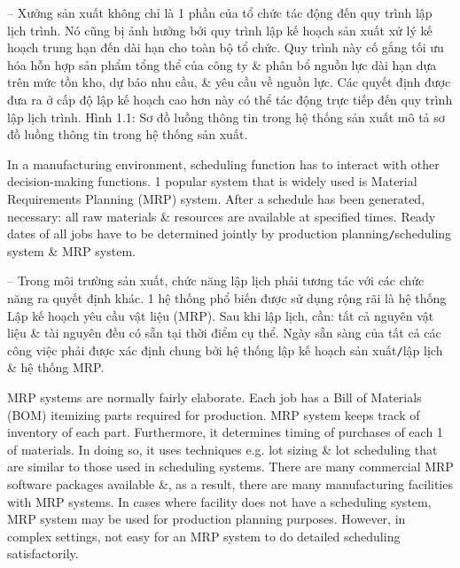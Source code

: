 \documentclass{article}
\begin{document}
\begin{itemize}
\begin{itemize}
\begin{itemize}
            -- Xưởng sản xuất không chỉ là 1 phần của tổ chức tác động đến quy trình lập lịch trình. Nó cũng bị ảnh hưởng bởi quy trình lập kế hoạch sản xuất xử lý kế hoạch trung hạn đến dài hạn cho toàn bộ tổ chức. Quy trình này cố gắng tối ưu hóa hỗn hợp sản phẩm tổng thể của công ty \& phân bổ nguồn lực dài hạn dựa trên mức tồn kho, dự báo nhu cầu, \& yêu cầu về nguồn lực. Các quyết định được đưa ra ở cấp độ lập kế hoạch cao hơn này có thể tác động trực tiếp đến quy trình lập lịch trình. {\sf Hình 1.1: Sơ đồ luồng thông tin trong hệ thống sản xuất} mô tả sơ đồ luồng thông tin trong hệ thống sản xuất.
            
            In a manufacturing environment, scheduling function has to interact with other decision-making functions. 1 popular system that is widely used is Material Requirements Planning (MRP) system. After a schedule has been generated, necessary: all raw materials \& resources are available at specified times. Ready dates of all jobs have to be determined jointly by production planning{\tt/}scheduling system \& MRP system.
            
            -- Trong môi trường sản xuất, chức năng lập lịch phải tương tác với các chức năng ra quyết định khác. 1 hệ thống phổ biến được sử dụng rộng rãi là hệ thống Lập kế hoạch yêu cầu vật liệu (MRP). Sau khi lập lịch, cần: tất cả nguyên vật liệu \& tài nguyên đều có sẵn tại thời điểm cụ thể. Ngày sẵn sàng của tất cả các công việc phải được xác định chung bởi hệ thống lập kế hoạch sản xuất{\tt/}lập lịch \& hệ thống MRP.
            
            MRP systems are normally fairly elaborate. Each job has a Bill of Materials (BOM) itemizing parts required for production. MRP system keeps track of inventory of each part. Furthermore, it determines timing of purchases of each 1 of materials. In doing so, it uses techniques e.g. lot sizing \& lot scheduling that are similar to those used in scheduling systems. There are many commercial MRP software packages available \&, as a result, there are many manufacturing facilities with MRP systems. In cases where facility does not have a scheduling system, MRP system may be used for production planning purposes. However, in complex settings, not easy for an MRP system to do detailed scheduling satisfactorily.
            

\end{itemize}
\end{itemize}
\end{itemize}
\end{document}
